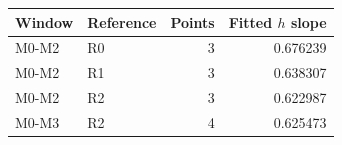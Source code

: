 \begin{tabular}{@{}llrr@{}}
\toprule
Window & Reference & Points & Fitted $h$ slope\\
\midrule
M0-M2 & R0 & 3 & 0.676239\\
M0-M2 & R1 & 3 & 0.638307\\
M0-M2 & R2 & 3 & 0.622987\\
M0-M3 & R2 & 4 & 0.625473\\
\bottomrule
\end{tabular}
